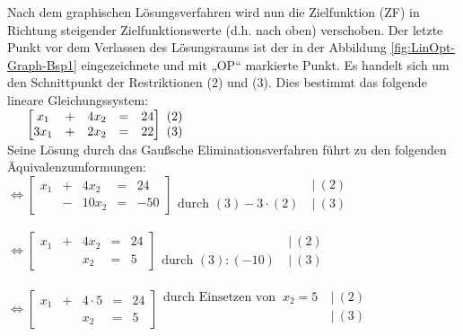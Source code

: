 		Nach dem graphischen Lösungsverfahren wird nun die Zielfunktion (ZF) in Richtung steigender Zielfunktionswerte (d.h. nach oben) verschoben. Der letzte Punkt vor dem Verlassen des Lösungsraums ist der in der Abbildung \ref{fig:LinOpt-Graph-Bsp1} 				eingezeichnete und mit „OP“ markierte Punkt. Es handelt sich um den Schnittpunkt der Restriktionen (2) und (3). Dies bestimmt das folgende lineare Gleichungssystem: \\

		$\hspace*{5,4mm}
		\begin{bmatrix}
			x_{1} & + & 4x_{2} &= & 24  \\
			3x_{1} & + & 2x_{2} &= & 22 
		\end{bmatrix}
		\begin{matrix}
			\  (2) \\
			\  (3) 
		\end{matrix}
		$ \\ 
		
		Seine Lösung durch das Gaußsche Eliminationsverfahren führt zu den folgenden Äquivalenzumformungen: \\

		$\Leftrightarrow
		\begin{bmatrix}
	 		x_{1}  &  + & 4x_{2}  &= &  24  \\
			&  - & 10x_{2} &= & -50 
		\end{bmatrix}
		\begin{matrix}
			& \ | \ (2)  \\
			\text{durch } (3) - 3 \cdot (2)	& \ | \ (3)
		\end{matrix}$ \\ \\

		$\Leftrightarrow
		\begin{bmatrix}
			x_{1} &  + & 4x_{2} & = & 24  \\
			  &    & x_{2}  &= & 5 	
		\end{bmatrix}
		\begin{matrix}
			& \ | \ (2)  \\
		\text{durch } (3) : (-10)	& \ | \ (3)
		\end{matrix}$ \\ \\

		$\Leftrightarrow
		\begin{bmatrix}
			x_{1} &  + & 4 \cdot 5 & = & 24  \\
			&   & x_{2}  &= & 5 	
		\end{bmatrix}
		\begin{matrix}
			\text{durch Einsetzen von } \ x_2 = 5 & \ | \ (2) \\
			& \ | \ (3)  \\
		\end{matrix}$ \\ \\

